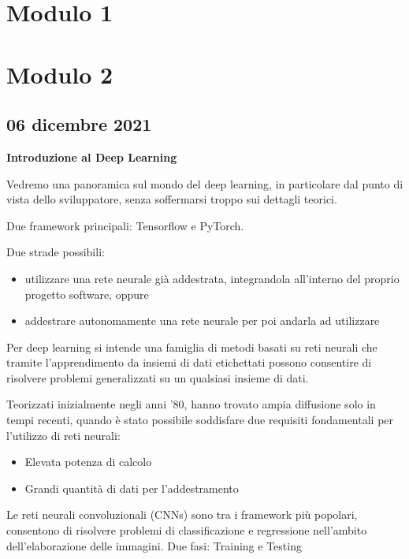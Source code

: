 \documentclass[a4paper,oneside]{book}
\begin{document}
    \chapter{Modulo 1}
    
    \chapter{Modulo 2}

    \section{06 dicembre 2021}

    \textbf{Introduzione al Deep Learning}

    Vedremo una panoramica sul mondo del deep learning,
    in particolare dal punto di vista dello sviluppatore,
    senza soffermarsi troppo sui dettagli teorici.

    Due framework principali: Tensorflow e PyTorch.

    Due strade possibili:
        \begin{itemize}
        \item utilizzare una rete neurale
        già addestrata, integrandola all'interno del proprio
        progetto software, oppure
        \item addestrare autonomamente una rete neurale per poi
        andarla ad utilizzare 
        \end{itemize}

    Per deep learning si intende una famiglia di metodi
    basati su reti neurali che tramite l'apprendimento da
    insiemi di dati etichettati possono consentire di risolvere
    problemi generalizzati su un qualsiasi insieme di dati.
    
    Teorizzati inizialmente negli anni '80, hanno trovato
    ampia diffusione solo in tempi recenti, quando è stato
    possibile soddisfare due requisiti fondamentali per l'utilizzo
    di reti neurali:
    \begin{itemize}
        \item Elevata potenza di calcolo
        \item Grandi quantità di dati per l'addestramento 
    \end{itemize}

    Le reti neurali convoluzionali (CNNs) sono tra i framework più popolari, 
    consentono di risolvere problemi di classificazione e regressione nell'ambito dell'elaborazione delle immagini.
    Due fasi: Training e Testing
\end{document}
